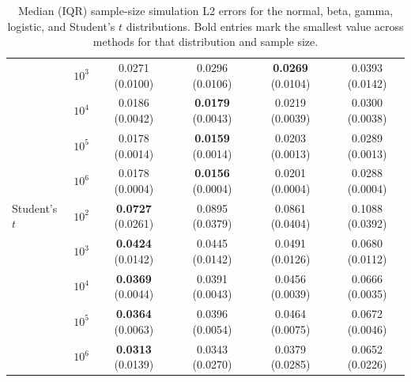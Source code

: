 \begin{table}[p]
{\begin{tabular}{llcccc}
 & $10^3$ & 0.0271 (0.0100) & 0.0296 (0.0106) & \textbf{0.0269} (0.0104) & 0.0393 (0.0142) \\
 & $10^4$ & 0.0186 (0.0042) & \textbf{0.0179} (0.0043) & 0.0219 (0.0039) & 0.0300 (0.0038) \\
 & $10^5$ & 0.0178 (0.0014) & \textbf{0.0159} (0.0014) & 0.0203 (0.0013) & 0.0289 (0.0013) \\
 & $10^6$ & 0.0178 (0.0004) & \textbf{0.0156} (0.0004) & 0.0201 (0.0004) & 0.0288 (0.0004) \\[0.6ex]
\midrule
Student's $t$ & $10^2$ & \textbf{0.0727} (0.0261) & 0.0895 (0.0379) & 0.0861 (0.0404) & 0.1088 (0.0392) \\
 & $10^3$ & \textbf{0.0424} (0.0142) & 0.0445 (0.0142) & 0.0491 (0.0126) & 0.0680 (0.0112) \\
 & $10^4$ & \textbf{0.0369} (0.0044) & 0.0391 (0.0043) & 0.0456 (0.0039) & 0.0666 (0.0035) \\
 & $10^5$ & \textbf{0.0364} (0.0063) & 0.0396 (0.0054) & 0.0464 (0.0075) & 0.0672 (0.0046) \\
 & $10^6$ & \textbf{0.0313} (0.0139) & 0.0343 (0.0270) & 0.0379 (0.0285) & 0.0652 (0.0226) \\[0.6ex]
\bottomrule
\end{tabular}%
}
\caption{Median (IQR) sample-size simulation L2 errors for the normal, beta, gamma, logistic, and Student's $t$ distributions. Bold entries mark the smallest value across methods for that distribution and sample size.}
\label{tab:l2_sample_size_group1_median}
\end{table}

